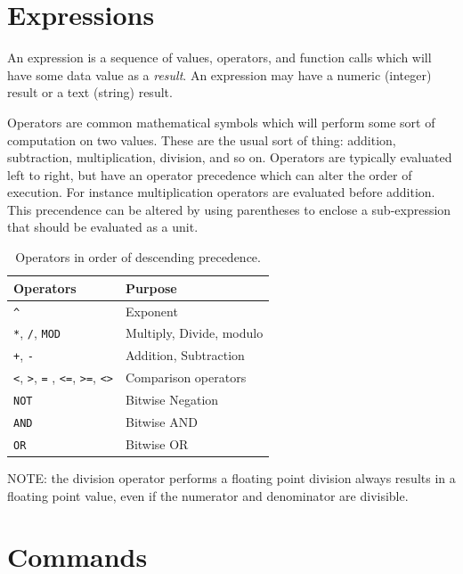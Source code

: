 \documentclass{report}
\begin{document}
    \section*{Expressions}

    An expression is a sequence of values, operators, and function calls which will have some data value as a {\em result}.
    An expression may have a numeric (integer) result or a text (string) result.

    Operators are common mathematical symbols which will perform some sort of computation on two values. These are the usual
    sort of thing: addition, subtraction, multiplication, division, and so on. Operators are typically evaluated left to right,
    but have an operator precedence which can alter the order of execution. For instance multiplication operators are evaluated
    before addition. This precendence can be altered by using parentheses to enclose a sub-expression that should be evaluated
    as a unit.

    \begin{table}[!htb]
        \begin{center}
            \begin{tabular}{|l|l|} \hline
                Operators & Purpose \\ \hline\hline
                \verb+^+ & Exponent \\ \hline
                \verb+*+, \verb+/+, \verb+MOD+ & Multiply, Divide, modulo \\ \hline
                \verb-+-, \verb+-+ & Addition, Subtraction \\ \hline
                \verb+<+, \verb+>+, \verb+=+ , \verb+<=+, \verb+>=+, \verb+<>+ & Comparison operators \\ \hline
                \verb+NOT+ & Bitwise Negation \\ \hline
                \verb+AND+ & Bitwise AND \\ \hline
                \verb+OR+ & Bitwise OR \\ \hline
            \end{tabular}
            \caption{Operators in order of descending precedence.}
        \end{center}
    \end{table}

    NOTE: the division operator performs a floating point division always results in a floating point value,
    even if the numerator and denominator are divisible.

    \section*{Commands}
\end{document}
